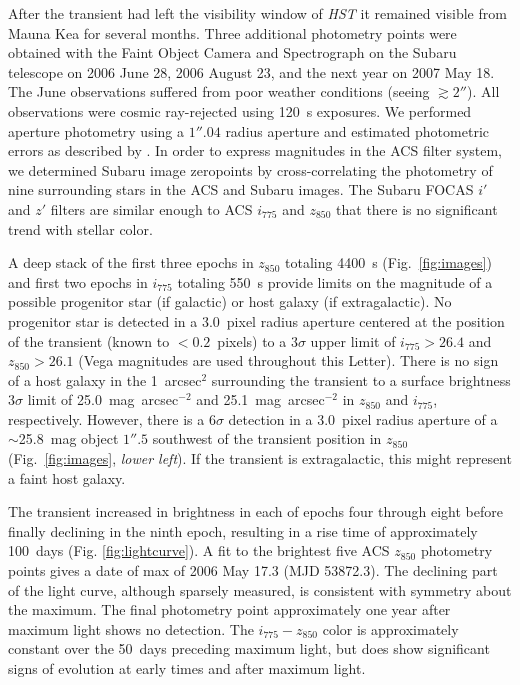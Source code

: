 After the transient had left the visibility window of \emph{HST} it remained 
visible from Mauna Kea for several months. Three additional photometry points 
were obtained with the Faint Object Camera and Spectrograph 
\citep[FOCAS;][]{kashikawa02a} 
on the Subaru telescope on 2006 June 28, 2006 August 23, 
and the next year on 2007 May 18. The June observations suffered from poor 
weather conditions (seeing $\gtrsim 2''$). 
All observations were cosmic ray-rejected using 120~s exposures. 
We performed aperture photometry using a $1''.04$ radius aperture and 
estimated photometric errors as described by \citet{morokuma08a}. 
In order to express magnitudes in the ACS filter 
system, we determined Subaru image zeropoints by cross-correlating the 
photometry of nine surrounding stars in the ACS and Subaru images. The 
Subaru FOCAS $i'$ and $z'$ filters are similar enough to ACS $i_{775}$ and 
$z_{850}$ that there is no significant trend with stellar color.

A deep stack of the first three epochs in $z_{850}$ totaling 4400~s 
(Fig.~\ref{fig:images}) and first two epochs 
in $i_{775}$ totaling 550~s provide limits on the magnitude of a possible 
progenitor star (if galactic) or host galaxy (if extragalactic).
No progenitor star is detected in a 3.0~pixel radius aperture centered at the 
position of the transient (known to $< 0.2$~pixels) to a $3\sigma$ upper limit 
of $i_{775} > 26.4$ and $z_{850} > 26.1$ 
(Vega magnitudes are used throughout this Letter).
There is no sign of a host galaxy in the 1~arcsec$^2$ surrounding the 
transient to a surface brightness $3\sigma$ limit of 25.0~mag~arcsec$^{-2}$ and 
25.1~mag~arcsec$^{-2}$ in $z_{850}$ and $i_{775}$, respectively.
However, there is a $6\sigma$ detection in a 3.0~pixel radius aperture of a 
$\sim$25.8~mag object $1''.5$ southwest of the 
transient position in $z_{850}$ (Fig.~\ref{fig:images}, \emph{lower left}). 
If the transient is extragalactic, this might represent a faint host galaxy.

The transient increased in brightness in each of 
epochs four through eight before finally declining in the ninth epoch, 
resulting in a rise time of approximately 100~days 
(Fig. \ref{fig:lightcurve}). 
A fit to the brightest five ACS $z_{850}$ photometry points 
gives a date of max of 2006 May 17.3 (MJD 53872.3). 
The declining part of the light curve, although sparsely measured, 
is consistent with symmetry about the maximum. 
The final photometry point approximately one year after maximum light shows 
no detection. The $i_{775} - z_{850}$ color is approximately constant over 
the 50~days preceding maximum light, but does show significant signs of 
evolution at early times and after maximum light.


